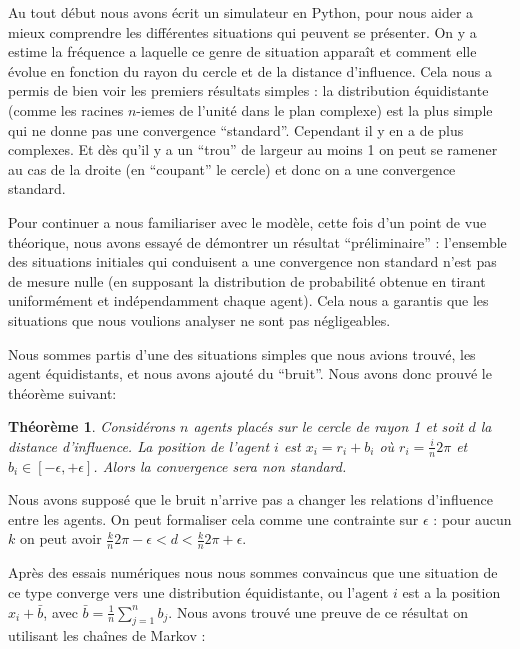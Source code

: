 \documentclass[a4paper,10pt]{article}
\newtheorem{theorem}{Théorème}
\begin{document}
Au tout début nous avons écrit un simulateur en Python, pour nous aider a mieux comprendre les différentes situations qui peuvent se présenter. On y a estime la fréquence a laquelle ce genre de situation apparaît et comment elle évolue en fonction du rayon du cercle et de la distance d'influence. Cela nous a permis de bien voir les premiers résultats simples : la distribution équidistante (comme les racines $n$-iemes de l’unité dans le plan complexe) est la plus simple qui ne donne pas une convergence ``standard''. Cependant il y en a de plus complexes. Et dès qu'il y a un ``trou'' de largeur au moins 1 on peut se ramener au cas de la droite (en ``coupant'' le cercle) et donc on a une convergence standard.

Pour continuer a nous familiariser avec le modèle, cette fois d'un point de vue théorique, nous avons essayé de démontrer un résultat ``préliminaire'' : l'ensemble des situations initiales qui conduisent a une convergence non standard n'est pas de mesure nulle (en supposant la distribution de probabilité obtenue en tirant uniformément et indépendamment chaque agent). Cela nous a garantis que les situations que nous voulions analyser ne sont pas négligeables.

Nous sommes partis d'une des situations simples que nous avions trouvé, les agent équidistants, et nous avons ajouté du ``bruit''. Nous avons donc prouvé le théorème suivant:
\begin{theorem}
Considérons $n$ agents placés sur le cercle de rayon 1 et soit $d$ la distance d'influence. La position de l'agent $i$ est $x_i = r_i + b_i$ où $r_i = \frac{i}{n} 2 \pi$ et $b_i \in [-\epsilon, +\epsilon]$. Alors la convergence sera non standard.
\end{theorem}

Nous avons supposé que le bruit n'arrive pas a changer les relations d'influence entre les agents. On peut formaliser cela comme une contrainte sur $\epsilon$ : pour aucun $k$ on peut avoir $\frac{k}{n} 2 \pi - \epsilon < d < \frac{k}{n} 2 \pi + \epsilon$.

Après des essais numériques nous nous sommes convaincus que une situation de ce type converge vers une distribution équidistante, ou l'agent $i$ est a la position $x_i + \bar b$, avec $\bar b = \frac{1}{n} \sum_{j=1}^n b_j$. Nous avons trouvé une preuve de ce résultat on utilisant les chaînes de Markov :
\end{document}
